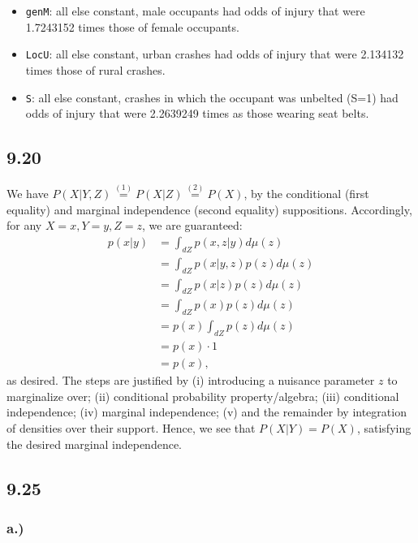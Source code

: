 \documentclass[
]{article}
\begin{document}
\begin{itemize}
\item
  \texttt{genM}: all else constant, male occupants had odds of injury
  that were 1.7243152 times those of female occupants.
\item
  \texttt{LocU}: all else constant, urban crashes had odds of injury
  that were 2.134132 times those of rural crashes.
\item
  \texttt{S}: all else constant, crashes in which the occupant was
  unbelted (S=1) had odds of injury that were 2.2639249 times as those
  wearing seat belts.
\end{itemize}

\hypertarget{section-6}{%
\subsection{9.20}\label{section-6}}

We have \(P(X|Y, Z) \overset{(1)}{=} P(X|Z) \overset{(2)}{=} P(X)\), by
the conditional (first equality) and marginal independence (second
equality) suppositions. Accordingly, for any \(X=x, Y=y, Z=z\), we are
guaranteed: \begin{align*}
p(x|y)
&=
\int_{dZ} p(x, z|y)d\mu(z) \\
&=
\int_{dZ} p(x|y, z)p(z)d\mu(z) \\
&=
\int_{dZ} p(x|z)p(z)d\mu(z) \\
&=
\int_{dZ} p(x)p(z)d\mu(z) \\
&=
p(x) \int_{dZ} p(z)d\mu(z) \\
&=
p(x)\cdot 1 \\
&=
p(x),
\end{align*} as desired. The steps are justified by (i) introducing a
nuisance parameter \(z\) to marginalize over; (ii) conditional
probability property/algebra; (iii) conditional independence; (iv)
marginal independence; (v) and the remainder by integration of densities
over their support. Hence, we see that \(P(X|Y) = P(X)\), satisfying the
desired marginal independence.

\hypertarget{section-7}{%
\subsection{9.25}\label{section-7}}

\hypertarget{a.-4}{%
\subsubsection{a.)}\label{a.-4}}
\end{document}
